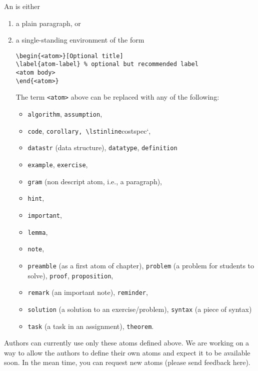 \begin{definition}[Atom]
An  is either
\begin{enumerate}
\item a plain paragraph, or
\item a single-standing environment of the form

\begin{lstlisting}
\begin{<atom>}[Optional title]
\label{atom-label} % optional but recommended label
<atom body>
\end{<atom>}
\end{lstlisting}
%
The term \lstinline`<atom>` above can be replaced with any of the following:
\begin{itemize}
\item \lstinline`algorithm`, \lstinline`assumption`,
\item \lstinline`code`, \lstinline`corollary, \lstinline`costspec`,
\item \lstinline`datastr` (data structure), \lstinline`datatype`, \lstinline`definition`
\item \lstinline`example`, \lstinline`exercise`,
\item \lstinline`gram`  (non descript atom, i.e., a paragraph),
\item \lstinline`hint`, 
\item \lstinline`important`, 
\item \lstinline`lemma`,
\item \lstinline`note`,
\item \lstinline`preamble` (as a  first atom of chapter), \lstinline`problem` (a problem for students to solve), \lstinline`proof`, \lstinline`proposition`,
\item \lstinline`remark` (an important note), \lstinline`reminder`,
\item \lstinline`solution` (a solution to an exercise/problem), \lstinline`syntax` (a piece of syntax)
\item \lstinline`task` (a task in an assignment), \lstinline`theorem`.
\end{itemize}
\end{enumerate}

\end{definition}

\begin{note}
Authors can currently use only these atoms defined above. We are working on a way to allow the authors to define their own atoms and expect it to be available soon.  In the mean time, you can request new atoms  (please send feedback here).
\end{note}

